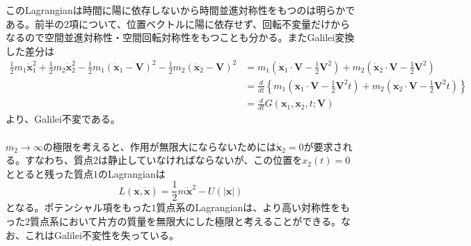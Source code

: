 \documentclass{jsarticle}
\begin{document}
このLagrangianは時間に陽に依存しないから時間並進対称性をもつのは明らかである。前半の\(2\)項について、位置ベクトルに陽に依存せず、回転不変量だけからなるので空間並進対称性・空間回転対称性をもつことも分かる。またGalilei変換した差分は
\begin{align*}
\frac{1}{2}m_{1}\dot{\bm{x}}_{1}^{2}+\frac{1}{2}m_{2}\dot{\bm{x}}_{2}^{2}-\frac{1}{2}m_{1}(\dot{\bm{x}}_{1}-\bm{V})^{2}-\frac{1}{2}m_{2}(\dot{\bm{x}}_{2}-\bm{V})^{2}&=m_{1}\left(\dot{\bm{x}}_{1}\cdot\bm{V}-\frac{1}{2}\bm{V}^{2}\right)+m_{2}\left(\dot{\bm{x}}_{2}\cdot\bm{V}-\frac{1}{2}\bm{V}^{2}\right)\\
&=\frac{d}{dt}\left\{m_{1}\left(\bm{x}_{1}\cdot\bm{V}-\frac{1}{2}\bm{V}^{2}t\right)+m_{2}\left(\bm{x}_{2}\cdot\bm{V}-\frac{1}{2}\bm{V}^{2}t\right)\right\}\\
&=\frac{d}{dt}G(\bm{x}_{1},\bm{x}_{2},t;\bm{V})
\end{align*}
より、Galilei不変である。\\
\\
\(m_{2}\to\infty\)の極限を考えると、作用が無限大にならないためには\(\dot{\bm{x}}_{2}=0\)が要求される。すなわち、質点\(2\)は静止していなければならないが、この位置を\(x_{2}(t)=0\)ととると残った質点\(1\)のLagrangianは
\[L(\bm{x},\dot{\bm{x}})=\frac{1}{2}m\dot{\bm{x}}^{2}-U(|\bm{x}|)\]
となる。ポテンシャル項をもった\(1\)質点系のLagrangianは、より高い対称性をもった\(2\)質点系において片方の質量を無限大にした極限と考えることができる。なお、これはGalilei不変性を失っている。\\
\end{document}
